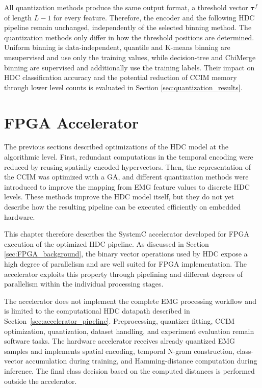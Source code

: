             All quantization methods produce the same output format, a threshold vector $\boldsymbol{\tau}^f$ of length $L-1$ for every feature. Therefore, the encoder and the following HDC pipeline remain unchanged, independently of the selected binning method. The quantization methods only differ in how the threshold positions are determined. Uniform binning is data-independent, quantile and K-means binning are unsupervised and use only the training values, while decision-tree and ChiMerge binning are supervised and additionally use the training labels. Their impact on HDC classification accuracy and the potential reduction of \ac{CCIM} memory through lower level counts is evaluated in Section \ref{sec:quantization_results}.\\
            

\section{FPGA Accelerator}
\label{sec:fpga_accelerator}
The previous sections described optimizations of the HDC model at the algorithmic level. 
First, redundant computations in the temporal encoding were reduced by reusing spatially encoded hypervectors. 
Then, the representation of the \ac{CCIM} was optimized with a \ac{GA}, and different quantization methods were introduced to improve the mapping from EMG feature values to discrete HDC levels. These methods improve the \ac{HDC} model itself, but they do not yet describe how the resulting pipeline can be executed efficiently on embedded hardware.

This chapter therefore describes the SystemC accelerator developed for FPGA execution of the optimized HDC pipeline. As discussed in Section \ref{sec:FPGA_background}, the binary vector operations used by HDC expose a high degree of parallelism and are well suited for FPGA implementation. The accelerator exploits this property through pipelining and different degrees of parallelism within the individual processing stages.

The accelerator does not implement the complete EMG processing workflow and is limited to the computational HDC datapath described in Section~\ref{sec:accelerator_pipeline}. Preprocessing, quantizer fitting, CCIM optimization, quantization, dataset handling, and experiment evaluation remain software tasks. 
The hardware accelerator receives already quantized EMG samples and implements spatial encoding, temporal N-gram construction, class-vector accumulation during training, and Hamming-distance computation during inference. The final class decision based on the computed distances is performed outside the accelerator.


